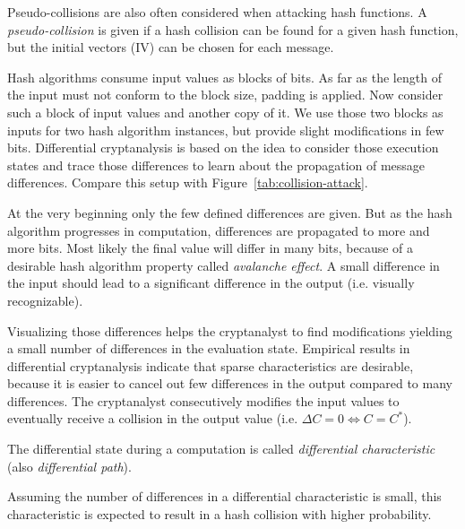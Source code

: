 Pseudo-collisions are also often considered when attacking hash functions.
A \emph{pseudo-collision} is given if a hash collision can be found for a given
hash function, but the initial vectors (IV) can be chosen for each message.

Hash algorithms consume input values as blocks of bits.
As far as the length of the input must not conform to the block size,
padding is applied. Now consider such a block of input values
and another copy of it. We use those two blocks as inputs for two
hash algorithm instances, but provide slight modifications in few bits.
Differential cryptanalysis is based on the idea to consider those execution states
and trace those differences to learn about the propagation of message differences.
Compare this setup with Figure~\ref{tab:collision-attack}.

At the very beginning only the few defined differences are given. But as the
hash algorithm progresses in computation, differences are propagated to more
and more bits. Most likely the final value will differ in many bits, because
of a desirable hash algorithm property called \emph{avalanche effect}.
A small difference in the input should lead to a significant difference
in the output (i.e. visually recognizable).

Visualizing those differences helps the cryptanalyst to find modifications
yielding a small number of differences in the evaluation state. Empirical
results in differential cryptanalysis indicate that sparse characteristics
are desirable, because it is easier to cancel out few differences in the
output compared to many differences.
The cryptanalyst consecutively modifies the input values to eventually
receive a collision in the output value (i.e. $\Delta C = 0 \iff C = C^*$).

\begin{defi}
  The differential state during a computation is called
  \emph{differential characteristic} (also \emph{differential path}).
\end{defi}

\begin{theorem}
  Assuming the number of differences in a differential characteristic is small,
  this characteristic is expected to result in a hash collision with higher probability.
\end{theorem}

